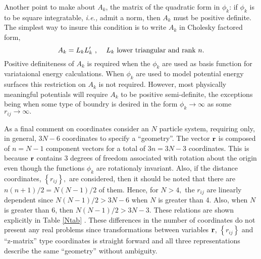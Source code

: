 Another point to make about $A_k$, the matrix of the quadratic form in $\phi
_k$: if $\phi _k$ is to be square integratable, {\it i.e.,} admit a norm,
then $A_k$ must be positive definite. The simplest way to insure this
condition is to write $A_k$ in Cholesky factored form, 
\begin{equation}
A_k=L_kL_k^{\prime }\text{ ,\thinspace \thinspace \thinspace \thinspace
\thinspace \thinspace \thinspace \thinspace }L_k\text{ lower triangular and
rank }n.
\end{equation}
Positive definiteness of $A_k$ is required when the $\phi _k$ are used as
basis function for variataional energy calculations. When $\phi _k$ are used
to model potential energy surfaces this restriction on $A_k$ is not
required. However, most physically meaningful potentials will require $A_k$
to be positive semi-definite, the exceptions being when some type of boundry
is desired in the form $\phi _k\rightarrow \infty $ as some $%
r_{ij}\rightarrow \infty .$

As a final comment on coordinates consider an $N$ particle system, requiring
only, in general, $3N-6$ coordinates to specify a ``geometry''. The vector $%
{\bf r}$ is composed of $n=N-1$ component vectors for a total of $3n=3N-3$
coordinates. This is because ${\bf r}$ contains 3 degrees of freedom
associated with rotation about the origin even though the functions $\phi _k$
are rotationaly invariant. Also, if the distance coordinates, $\left\{
r_{ij}\right\} ,$ are considered, then it should be noted that there are $%
n\left( n+1\right) /2=N\left( N-1\right) /2$ of them. Hence, for $N>4,$ the $%
r_{ij}$ are linearly dependent since $N\left( N-1\right) /2>3N-6$ when $N$
is greater than 4. Also, when $N$ is greater than 6, then $N\left(
N-1\right) /2>3N-3.$ These relations are shown explicitly in Table \ref{Ntab}%
. These differences in the number of coordinates do not present any real
problems since transformations between variables ${\bf r}$, $\left\{
r_{ij}\right\} $ and ``z-matrix'' type coordinates is straight forward and
all three representations describe the same ``geometry'' without ambiguity.

